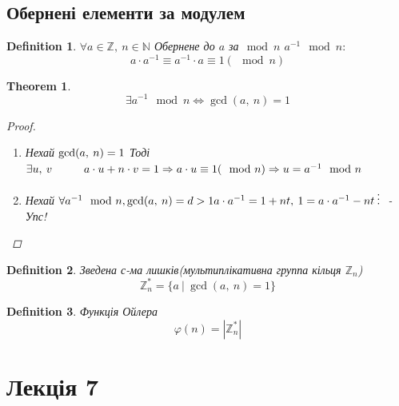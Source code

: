 \documentclass[a4paper,12pt, centered]{bookest}
\newtheorem{theorem}{Theorem}[section]
\newtheorem{definition}{Definition}[section]
\newcommand\tab[1][1cm]{\hspace*{#1}}
\begin{document}
\section{Обернені елементи за модулем}
\begin{definition}
	$\forall a\in\mathbb{Z},\>n\in\mathbb{N}$ Обернене до $a$ за$\mod n$ $a^{-1}\mod n:$
	$$a\cdot a^{-1}\equiv a^{-1}\cdot a\equiv 1(\mod n)$$
\end{definition}
\begin{theorem}
	$$\exists a^{-1}\mod n\Leftrightarrow\gcd(a,\>n)=1$$
	\begin{proof}$ $
		\begin{enumerate}
			\item Нехай $\gcd(a,\>n)=1\\$ Тоді $\exists u,\>v\tab a\cdot u+n\cdot v=1\Rightarrow a\cdot u\equiv 1(\mod n)\Rightarrow u=a^{-1}\mod n$  
			\item Нехай $\forall a^{-1}\mod n, \gcd (a,\>n)=d>1\\ a\cdot a^{-1}=1+nt,\>1=a\cdot a^{-1}-nt \>\vdots\>$ - Упс! 
		\end{enumerate}
	\end{proof}
\end{theorem}
\begin{definition}
	Зведена с-ма лишків(мультиплікативна группа кільця $\mathbb{Z}_n$) 
	$$\mathbb{Z}_n^*=\{a\>|\>\gcd(a,\>n)=1\}$$
\end{definition}
\begin{definition}
	Функція Ойлера $$\varphi(n)=|\mathbb{Z}_n^*|$$
\end{definition}
\chapter{Лекція 7}
\end{document}
